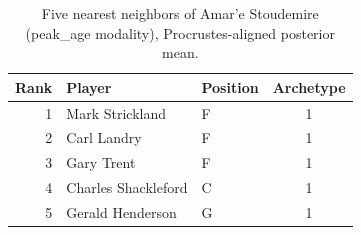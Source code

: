 \begin{table}[htbp]
  \centering\small
  \begin{tabular}{rllc}
    \toprule
    Rank & Player & Position & Archetype \\
    \midrule
    1 & Mark Strickland & F & 1 \\
    2 & Carl Landry & F & 1 \\
    3 & Gary Trent & F & 1 \\
    4 & Charles Shackleford & C & 1 \\
    5 & Gerald Henderson & G & 1 \\
    \bottomrule
  \end{tabular}
  \caption{Five nearest neighbors of Amar'e Stoudemire (peak_age modality), Procrustes-aligned posterior mean.}
  \label{tab:Amar_e_Stoudemire_neighbors_peak_age}
\end{table}

